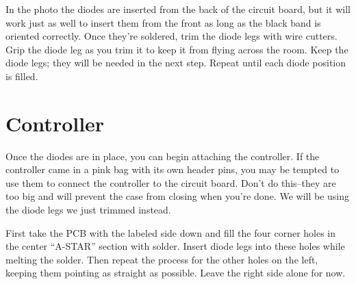 \documentclass{article}
\begin{document}
\vspace{1em}
\noindent{}
\vspace{1em}

In the photo the diodes are inserted from the back of the circuit
board, but it will work just as well to insert them from the front as
long as the black band is oriented correctly. Once they're soldered,
trim the diode legs with wire cutters. Grip the diode leg as you
trim it to keep it from flying across the room. Keep the diode legs;
they will be needed in the next step. Repeat until each diode position
is filled.

\section{Controller}

Once the diodes are in place, you can begin attaching the controller.
If the controller came in a pink bag with its own header pins, you may
be tempted to use them to connect the controller to the circuit
board. Don't do this--they are too big and will prevent the case from
closing when you're done. We will be using the diode legs we just
trimmed instead.

\vspace{1em}

First take the PCB with the labeled side down and fill the four corner
holes in the center ``A-STAR'' section with solder. Insert diode legs
into these holes while melting the solder. Then repeat the process for
the other holes on the left, keeping them pointing as straight as
possible. Leave the right side alone for now.

\vspace{1em}
\noindent{}
\vspace{1em}
\end{document}
